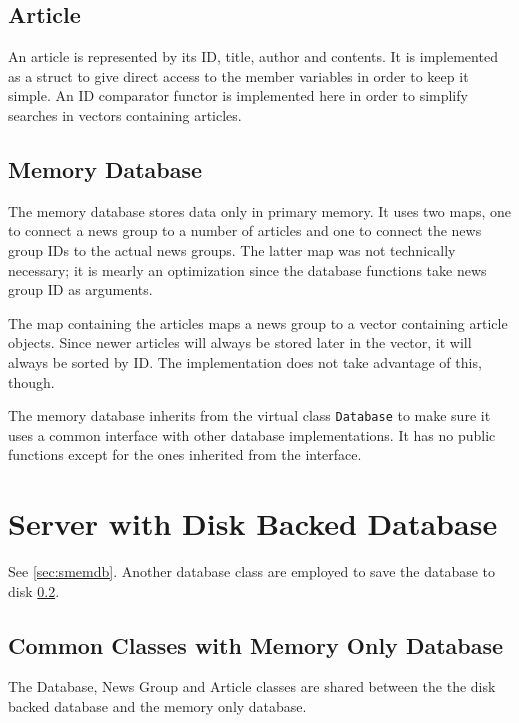 \documentclass{acmsiggraph}               %
\begin{document}
\subsection{Article}
\label{ssec:art}
An article is represented by its ID, title, author and contents. It is implemented as a struct to
give direct access to the member variables in order to keep it simple. An ID comparator functor
is implemented here in order to simplify searches in vectors containing articles.

\subsection{Memory Database}
\label{ssec:mem_db}
The memory database stores data only in primary memory. It uses two maps, one to connect a news group
to a number of articles and one to connect the news group IDs to the actual news groups. The latter
map was not technically necessary; it is mearly an optimization since the database functions take
news group ID as arguments. 

The map containing the articles maps a news group to a vector containing article objects. Since newer
articles will always be stored later in the vector, it will always be sorted by ID. The
implementation does not take advantage of this, though. 

The memory database inherits from the virtual class \texttt{Database} to make sure it uses a common 
interface with other database implementations. It has no public functions except for the ones inherited
from the interface.


\section{Server with Disk Backed Database}
\label{sec:sdiskdb}

See \ref{sec:smemdb}. Another database class are employed to save the
database to disk \ref{ssec:mem_db}.

\subsection{Common Classes with Memory Only Database}
\label{ssec:common_classes}
The Database, News Group and Article classes are shared between the the disk backed database
and the memory only database.
\end{document}
